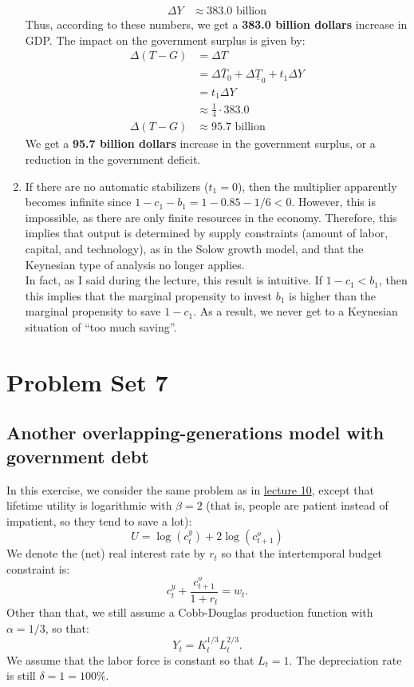 \documentclass[]{book}
\theoremstyle{definition}
\theoremstyle{definition}
\theoremstyle{definition}
\theoremstyle{remark}
\begin{document}
\begin{enumerate}
\[\begin{aligned}
  \Delta Y&\approx 383.0 \text{ billion}
  \end{aligned}
  \] Thus, according to these numbers, we get a \textbf{383.0 billion
  dollars} increase in GDP. The impact on the government surplus is
  given by: \[
  \begin{aligned}
  \Delta\left(T-G\right)&=\Delta T\\
  &=\Delta\bar{T}_{0}+\Delta\underline{T}_{0}+t_1\Delta Y\\
  &=t_1\Delta Y \\
  &\approx \frac{1}{4} \cdot 383.0\\
  \Delta\left(T-G\right)  & \approx 95.7 \text{ billion}
  \end{aligned}
  \] We get a \textbf{95.7 billion dollars} increase in the government
  surplus, or a reduction in the government deficit.
\item
  If there are no automatic stabilizers (\(t_1 = 0\)), then the
  multiplier apparently becomes infinite since
  \(1-c_1-b_1 = 1-0.85 - 1/6<0\). However, this is impossible, as there
  are only finite resources in the economy. Therefore, this implies that
  output is determined by supply constraints (amount of labor, capital,
  and technology), as in the Solow growth model, and that the Keynesian
  type of analysis no longer applies.\\
  In fact, as I said during the lecture, this result is intuitive. If
  \(1-c_1<b_1\), then this implies that the marginal propensity to
  invest \(b_1\) is higher than the marginal propensity to save
  \(1-c_1\). As a result, we never get to a Keynesian situation of ``too
  much saving''.
\end{enumerate}

\chapter{Problem Set 7}\label{pset7}

\section*{Another overlapping-generations model with government
debt}\label{another-overlapping-generations-model-with-government-debt}

In this exercise, we consider the same problem as in
\protect\hyperlink{public-debt}{lecture 10}, except that lifetime
utility is logarithmic with \(\beta = 2\) (that is, people are patient
instead of impatient, so they tend to save a lot):
\[U = \log(c_t^y) + 2\log(c_{t+1}^o)\] We denote the (net) real interest
rate by \(r_t\) so that the intertemporal budget constraint is:
\[c_{t}^{y}+\frac{c_{t+1}^{o}}{1+r_t}=w_{t}.\] Other than that, we still
assume a Cobb-Douglas production function with \(\alpha = 1/3\), so
that: \[Y_t = K_t^{1/3} L_t^{2/3}.\] We assume that the labor force is
constant so that \(L_t=1\). The depreciation rate is still
\(\delta = 1 = 100\%\).
\end{document}
